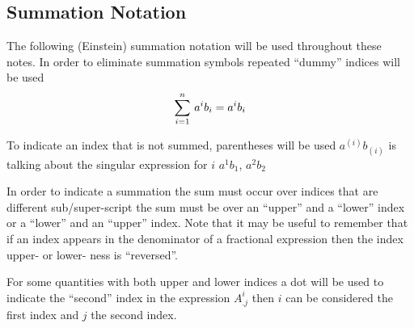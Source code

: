 \subsection{Summation Notation}
\label{subsec:IntroSummationNotation}

The following (Einstein) summation notation will be
used throughout these notes. In order to eliminate summation symbols repeated
``dummy'' indices will be used \ie
\begin{equation}
    \displaystyle\sum_{i=1}^{n} \,a^{i}b_{i} =a^{i}b_{i}
\end{equation}

To indicate an index that is not summed, parentheses will be used
\ie $a^{(i)}b_{(i)}$ is talking about the singular expression for $i$ \eg
$a^{1}b_{1}$, $a^{2}b_{2}$ \etc

In order to indicate a summation the sum must occur over indices that are
different sub/super-script \ie the sum must be over an ``upper'' and a
``lower'' index or a ``lower'' and an ``upper'' index. Note that it may be
useful to remember that if an index appears in the denominator of a fractional
expression then the index upper- or lower- ness is ``reversed''. 

For some quantities with both upper and lower indices a dot will be used to
indicate the ``second'' index \eg in the expression $A^{i}_{.j}$ then $i$ can
be considered the first index and $j$ the second index.
